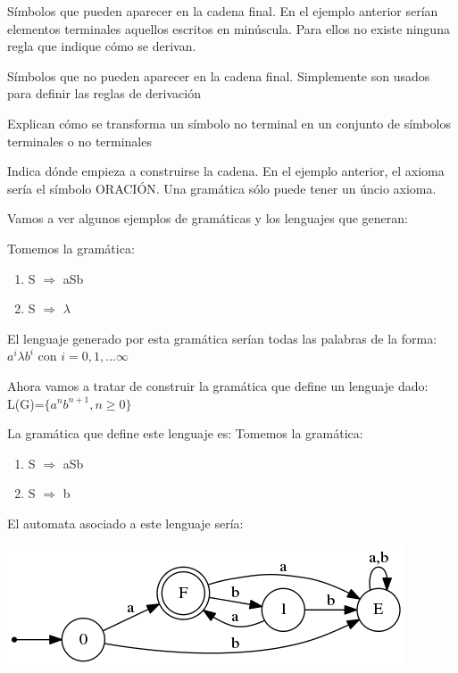 \documentclass{apuntes}
\begin{document}
\begin{defn}
Símbolos que pueden aparecer en la cadena final. En el ejemplo anterior serían elementos terminales aquellos escritos en minúscula. Para ellos no existe ninguna regla que indique cómo se derivan.
\end{defn}

\begin{defn}
Símbolos que no pueden aparecer en la cadena final. Simplemente son usados para definir las reglas de derivación
\end{defn}

\begin{defn}
Explican cómo se transforma un símbolo no terminal en un conjunto de símbolos terminales o no terminales
\end{defn}

\begin{defn}
Indica dónde empieza a construirse la cadena. En el ejemplo anterior, el axioma sería el símbolo ORACIÓN. Una gramática sólo puede tener un úncio axioma.
\end{defn}

Vamos a ver algunos ejemplos de gramáticas y los lenguajes que generan:
\begin{example}
Tomemos la gramática:
\begin{enumerate}
\item S $\Rightarrow$ aSb
\item S $\Rightarrow$ $\lambda$
\end{enumerate}

El lenguaje generado por esta gramática serían todas las palabras de la forma: $a^i\lambda b^i$ con $ i=0,1,... \infty$
\end{example}

\begin{example}
Ahora vamos a tratar de construir la gramática que define un lenguaje dado:
L(G)=$\lbrace a^nb^{n+1}, n \geq 0 \rbrace$

La gramática que define este lenguaje es:
Tomemos la gramática:
\begin{enumerate}
\item S $\Rightarrow$ aSb
\item S $\Rightarrow$ b
\end{enumerate}

El automata asociado a este lenguaje sería:
\begin{center}
\includegraphics[scale=0.75]{automata1.png}
\end{center}
\end{example}
\end{document}
